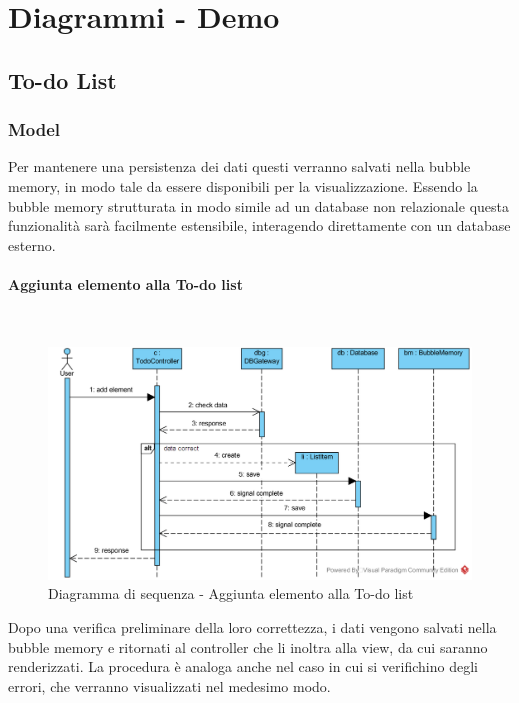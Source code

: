 \section{Diagrammi - Demo}

\subsection{To-do List}

\subsubsection{Model}
Per mantenere una persistenza dei dati questi verranno salvati nella bubble memory, in modo tale da essere disponibili per la visualizzazione. Essendo la bubble memory strutturata in modo simile ad un database non relazionale questa funzionalità sarà facilmente estensibile, interagendo direttamente con un database esterno.

\begin{samepage}
\paragraph{Aggiunta elemento alla To-do list}\mbox{}\\
\end{samepage}
\begin{figure}[H]
	\centering
	\includegraphics[width=14cm]{diagrammi_img/sequenza/todo_aggiungi_elemento.png}
	\caption{Diagramma di sequenza - Aggiunta elemento alla To-do list}
\end{figure}
Dopo una verifica preliminare della loro correttezza, i dati vengono salvati nella bubble memory e ritornati al controller che li inoltra alla view, da cui saranno renderizzati.
La procedura è analoga anche nel caso in cui si verifichino degli errori, che verranno visualizzati nel medesimo modo.

